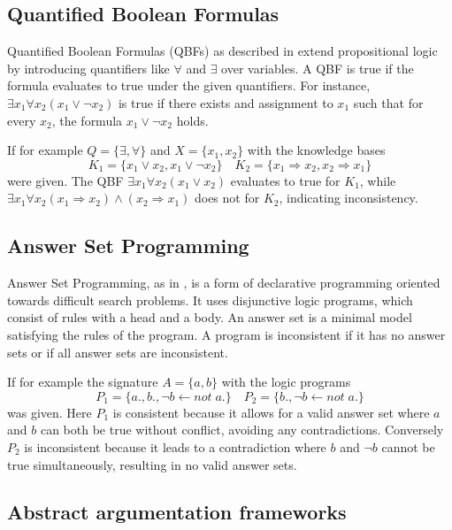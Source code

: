 \subsection{Quantified Boolean Formulas}
Quantified Boolean Formulas (QBFs) as described in \cite{gelfond_logic_2002} extend propositional logic by introducing quantifiers like \(\forall\) and \(\exists\) over variables.
A QBF is true if the formula evaluates to true under the given quantifiers.
For instance, \(\exists x_1 \forall x_2 (x_1 \lor \neg x_2)\) is true if there exists and assignment to \(x_1\) such that for every \(x_2\), the formula \(x_1 \lor \neg x_2\) holds.

If for example \(Q = \{\exists,\forall\}\) and \(X = \{x_1,x_2\}\) with the knowledge bases
\[K_1 = \{x_1 \lor  x_2, x_1 \lor \neg x_2\} \quad K_2 = \{x_1 \Rightarrow x_2, x_2 \Rightarrow x_1\}\]
were given.
The QBF \(\exists x_1 \forall x_2 (x_1 \lor x_2)\) evaluates to true for \(K_1\), while \(\exists x_1 \forall x_2 (x_1 \Rightarrow x_2) \land (x_2 \Rightarrow x_1)\) does not for \(K_2\), indicating inconsistency.

\subsection{Answer Set Programming}
Answer Set Programming, as in \cite{brewka_answer_2011}, is a form of declarative programming oriented towards difficult search problems.
It uses disjunctive logic programs, which consist of rules with a head and a body.
An answer set is a minimal model satisfying the rules of the program.
A program is inconsistent if it has no answer sets or if all answer sets are inconsistent.

If for example the signature \(A = \{a,b\}\) with the logic programs
\[P_1 = \{a., b., \neg b \leftarrow not \; a.\} \quad P_2 = \{b., \neg b \leftarrow not \; a.\}\]
was given.
Here \(P_1\) is consistent because it allows for a valid answer set where \(a\) and \(b\) can both be true without conflict, avoiding any contradictions.
Conversely \(P_2\) is inconsistent because it leads to a contradiction where \(b\) and \(\neg b\) cannot be true simultaneously, resulting in no valid answer sets.

\subsection{Abstract argumentation frameworks}
\cite{dung_acceptability_1995}

